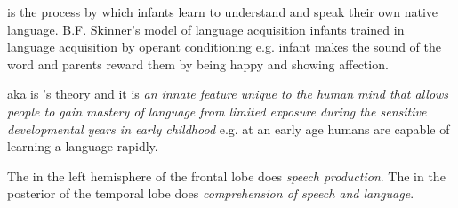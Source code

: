 \documentclass[../Psych_Soci_review.tex]{subfiles}
\begin{document}
 is the process by which infants learn to
understand and speak their own native language. B.F. Skinner's
 model of language acquisition \imp infants trained in
language acquisition by operant conditioning e.g. infant makes the sound of the
word and parents reward them by being happy and showing affection.\par

 aka  is
's theory and it is \textit{an innate feature unique to
the human mind that allows people to gain mastery of language from limited
exposure during the sensitive developmental years in early childhood} e.g. at an
early age humans are capable of learning a language rapidly.\par

The  in the left hemisphere of the frontal lobe does
\textit{speech production}. The   in the posterior of
the temporal lobe does \textit{comprehension of speech and language}.
\end{document}
